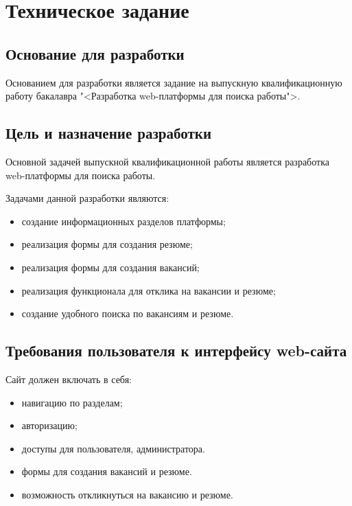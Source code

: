 \section{Техническое задание}
\subsection{Основание для разработки}

Основанием для разработки является задание на выпускную квалификационную работу бакалавра "<Разработка web-платформы для поиска работы">.

\subsection{Цель и назначение разработки}

Основной задачей выпускной квалификационной работы является разработка  web-платформы для поиска работы.

Задачами данной разработки являются:
\begin{itemize}
\item создание информационных разделов платформы;
\item реализация формы для создания резюме;
\item реализация формы для создания вакансий;
\item реализация функционала для отклика на вакансии и резюме;
\item создание удобного поиска по вакансиям и резюме.
\end{itemize}

\subsection{Требования пользователя к интерфейсу web-сайта}

Сайт должен включать в себя:
\begin{itemize}
    \item навигацию по разделам;
    \item авторизацию;
    \item доступы для пользователя, администратора.
    \item формы для создания вакансий и резюме.
    \item возможность откликнуться на вакансию и резюме.
\end{itemize}


